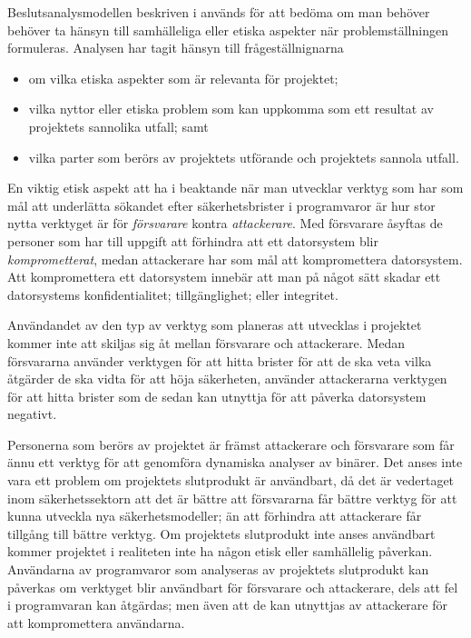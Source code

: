 Beslutsanalysmodellen beskriven i \cite{föreskrifter} används för att bedöma om man behöver behöver ta hänsyn till samhälleliga eller etiska aspekter när problemställningen formuleras.
Analysen har tagit hänsyn till frågeställnignarna
\begin{itemize}
    \item om vilka etiska aspekter som är relevanta för projektet;
    \item vilka nyttor eller etiska problem som kan uppkomma som ett resultat av projektets sannolika utfall; samt
    \item vilka parter som berörs av projektets utförande och projektets sannola utfall.
\end{itemize}

En viktig etisk aspekt att ha i beaktande när man utvecklar verktyg som har som mål att underlätta sökandet efter säkerhetsbrister i programvaror är hur stor nytta verktyget är för \emph{försvarare} kontra \emph{attackerare}.
Med försvarare åsyftas de personer som har till uppgift att förhindra att ett datorsystem blir \emph{komprometterat}, medan attackerare har som mål att kompromettera datorsystem.
Att kompromettera ett datorsystem innebär att man på något sätt skadar ett datorsystems konfidentialitet; tillgänglighet; eller integritet.

Användandet av den typ av verktyg som planeras att utvecklas i projektet kommer inte att skiljas sig åt mellan försvarare och attackerare.
Medan försvararna använder verktygen för att hitta brister för att de ska veta vilka åtgärder de ska vidta för att höja säkerheten, använder attackerarna verktygen för att hitta brister som de sedan kan utnyttja för att påverka datorsystem negativt.

Personerna som berörs av projektet är främst attackerare och försvarare som får ännu ett verktyg för att genomföra dynamiska analyser av binärer.
Det anses inte vara ett problem om projektets slutprodukt är användbart, då det är vedertaget inom säkerhetssektorn att det är bättre att försvararna får bättre verktyg för att kunna utveckla nya säkerhetsmodeller; än att förhindra att attackerare får tillgång till bättre verktyg.
Om projektets slutprodukt inte anses användbart kommer projektet i realiteten inte ha någon etisk eller samhällelig påverkan.
Användarna av programvaror som analyseras av projektets slutprodukt kan påverkas om verktyget blir användbart för försvarare och attackerare, dels att fel i programvaran kan åtgärdas; men även att de kan utnyttjas av attackerare för att kompromettera användarna.
